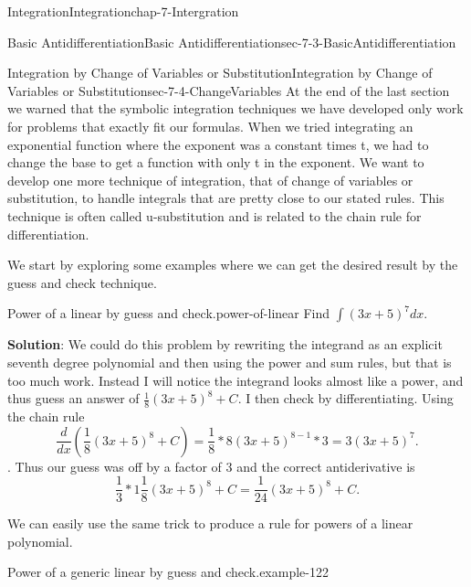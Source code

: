 \documentclass[oneside,10pt,]{book}
\newcommand{\terminology}[1]{\textbf{#1}}
\numberwithin{equation}{section}
\begin{document}
\begin{chapterptx}{Integration}{}{Integration}{}{}{chap-7-Intergration}
\begin{sectionptx}{Basic Antidifferentiation}{}{Basic Antidifferentiation}{}{}{sec-7-3-BasicAntidifferentiation}
\end{sectionptx}
%
%
\typeout{************************************************}
\typeout{************************************************}
%
\begin{sectionptx}{Integration by Change of Variables or Substitution}{}{Integration by Change of Variables or Substitution}{}{}{sec-7-4-ChangeVariables}
\hypertarget{p-2821}{}%
At the end of the last section we warned that the symbolic integration techniques we have developed only work for problems that exactly fit our formulas.  When we tried integrating an exponential function where the exponent was a constant times t, we had to change the base to get a function with only t in the exponent.  We want to develop one more technique of integration, that of change of variables or substitution, to handle integrals that are pretty close to our stated rules. This technique is often called u-substitution and is related to the chain rule for differentiation.%
\par
\hypertarget{p-2822}{}%
We start by exploring some examples where we can get the desired result by the guess and check technique.%
\begin{example}{Power of a linear by guess and check.}{power-of-linear}%
\hypertarget{p-2823}{}%
Find \(\int (3x+5)^7  dx\).%
\par
\hypertarget{p-2824}{}%
\terminology{Solution}:  We could do this problem by rewriting the integrand as an explicit seventh degree polynomial and then using the power and sum rules, but that is too much work.  Instead I will notice the integrand looks almost like a power, and thus guess an answer of \(\frac{1}{8} (3x+5)^8+C\).  I then check by differentiating.  Using the chain rule%
%
\begin{equation*}
\frac{d}{dx}  (\frac{1}{8} (3x+5)^8+C)=\frac{1}{8}*8(3x+5)^{8-1}*3=3(3x+5)^7.
\end{equation*}
. \hypertarget{p-2825}{}%
Thus our guess was off by a factor of 3 and the correct antiderivative is%
%
\begin{equation*}
\frac{1}{3}*1\frac{1}{8} (3x+5)^8+C=\frac{1}{24} (3x+5)^8+C.
\end{equation*}
\end{example}
\hypertarget{p-2826}{}%
We can easily use the same trick to produce a rule for powers of a linear polynomial.%
\begin{example}{Power of a generic linear by guess and check.}{example-122}%
\hypertarget{p-2827}{}%

\end{example}
\end{sectionptx}
\end{chapterptx}
\end{document}
